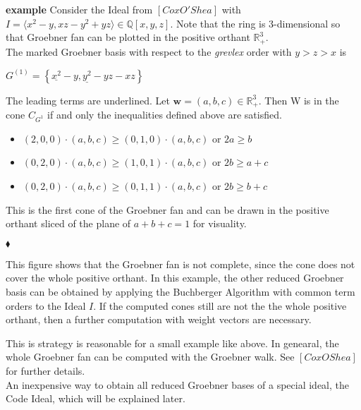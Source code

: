 \textbf{example}
Consider the Ideal from $\left[ Cox O'Shea\right] $ with $ I = \langle x^{2}-y,xz-y^{2}+yz \rangle \in \mathbb{Q}\left[ x,y,z\right] .$
Note that the ring is 3-dimensional so that Groebner fan can be plotted in the positive orthant $ \mathbb{R}^{3}_{+}$. \\
The marked Groebner basis with respect to the \textit{grevlex} order with $y>z>x$ is
\begin{center}
$G^{\left( 1\right) } = \left\lbrace \underline{x^{2}}-y,\underline{y^{2}} -yz -xz\right\rbrace $
\end{center}
The leading terms are underlined. Let $\textbf{w} = \left( a,b,c\right) \in \mathbb{R}^{3}_{+} $. Then W is in the cone $C_{G^{1}}$ if and only the inequalities defined above are satisfied.

\begin{itemize}

\item
$\left( 2,0,0\right) \cdot \left( a,b,c\right) \geq \left( 0,1,0\right) \cdot \left( a,b,c\right) $ or $2a\geq b$ 
\item
$\left( 0,2,0\right) \cdot \left( a,b,c\right) \geq \left( 1,0,1\right) \cdot \left( a,b,c\right) $ or $2b\geq a+c$ 
\item
$\left( 0,2,0\right) \cdot \left( a,b,c\right) \geq \left( 0,1,1\right) \cdot \left( a,b,c\right) $ or $2b\geq b+c$
\end{itemize} 

This is the first cone of the Groebner fan and can be drawn in the positive orthant sliced of the plane of $a+b+c=1$ for visuality.



\begin{flushright}
$\blacklozenge$
\end{flushright} 

This figure shows that the Groebner fan is not complete, since the cone does not cover the whole positive orthant. In this example, the other reduced Groebner basis can be obtained by applying the Buchberger Algorithm with common term orders to the Ideal $I$.
If the computed cones still are not the the whole positive orthant, then a further computation with weight vectors are necessary.

This is strategy is reasonable for a small example like above.
In genearal, the whole Groebner fan can be computed with the Groebner walk.
See $\left[ Cox OShea \right]$ for further details.\\
An inexpensive way to obtain all reduced Groebner bases of a special ideal, the Code Ideal, which will be explained later.

